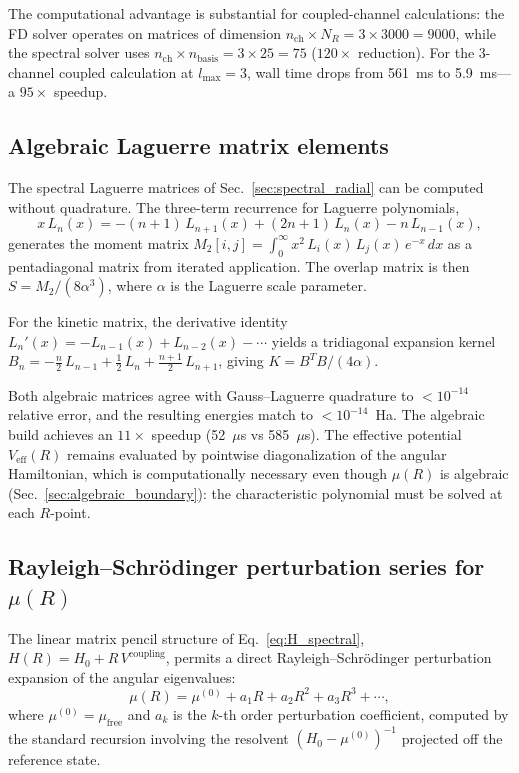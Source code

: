 \documentclass[aps,pra,twocolumn,superscriptaddress,longbibliography]{revtex4-2}
\begin{document}
The computational advantage is substantial for coupled-channel
calculations: the FD solver operates on matrices of dimension
$n_{\mathrm{ch}} \times N_R = 3 \times 3000 = 9000$, while the
spectral solver uses $n_{\mathrm{ch}} \times n_{\mathrm{basis}} =
3 \times 25 = 75$ ($120\times$ reduction).  For the 3-channel
coupled calculation at $l_{\max} = 3$, wall time drops from
561~ms to 5.9~ms---a $95\times$ speedup.

\subsection{Algebraic Laguerre matrix elements}
\label{sec:algebraic_laguerre}

The spectral Laguerre matrices of Sec.~\ref{sec:spectral_radial} can
be computed without quadrature.  The three-term recurrence for Laguerre
polynomials,
\begin{equation}
  x\,L_n(x) = -(n+1)\,L_{n+1}(x) + (2n+1)\,L_n(x) - n\,L_{n-1}(x),
\end{equation}
generates the moment matrix $M_{2}[i,j] = \int_0^\infty x^2\,
L_i(x)\,L_j(x)\,e^{-x}\,dx$ as a pentadiagonal matrix from
iterated application.  The overlap matrix is then $S = M_2 / (8\alpha^3)$,
where $\alpha$ is the Laguerre scale parameter.

For the kinetic matrix, the derivative identity
$L_n'(x) = -L_{n-1}(x) + L_{n-2}(x) - \cdots$ yields a tridiagonal
expansion kernel $B_n = -\tfrac{n}{2}\,L_{n-1} + \tfrac{1}{2}\,L_n
+ \tfrac{n+1}{2}\,L_{n+1}$, giving $K = B^T B / (4\alpha)$.

Both algebraic matrices agree with Gauss--Laguerre quadrature to
$< 10^{-14}$ relative error, and the resulting energies match to
$< 10^{-14}$~Ha.  The algebraic build achieves an $11\times$ speedup
(52~$\mu$s vs 585~$\mu$s).  The effective potential $V_{\mathrm{eff}}(R)$
remains evaluated by pointwise diagonalization of the angular
Hamiltonian, which is computationally necessary even though $\mu(R)$
is algebraic (Sec.~\ref{sec:algebraic_boundary}): the characteristic
polynomial must be solved at each $R$-point.

\subsection{Rayleigh--Schr\"odinger perturbation series for $\mu(R)$}
\label{sec:perturbation_series}

The linear matrix pencil structure of Eq.~\eqref{eq:H_spectral},
$H(R) = H_0 + R\,V^{\mathrm{coupling}}$, permits a direct
Rayleigh--Schr\"odinger perturbation expansion of the angular
eigenvalues:
\begin{equation}
  \mu(R) = \mu^{(0)} + a_1 R + a_2 R^2 + a_3 R^3 + \cdots,
  \label{eq:mu_series}
\end{equation}
where $\mu^{(0)} = \mu_{\mathrm{free}}$ and $a_k$ is the $k$-th order
perturbation coefficient, computed by the standard recursion involving
the resolvent $(H_0 - \mu^{(0)})^{-1}$ projected off the reference
state.
\end{document}
